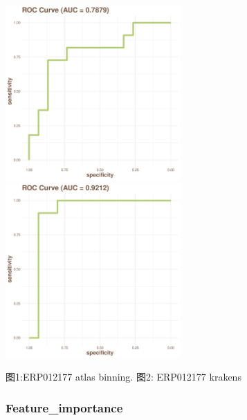 \documentclass[
]{article}
\begin{document}
\includegraphics[width=0.5\textwidth,height=0.5\textheight]{../../Analysis_shotgun_ERP012177/03_ML/shotgun/atlas_binning/ERP012177_binning_best.model_draw_Roc_plot.pdf}
\includegraphics[width=0.5\textwidth,height=0.5\textheight]{../../Analysis_shotgun_ERP012177/03_ML/shotgun/krakens/ERP012177_best.model_draw_Roc_plot.pdf}

图1:ERP012177 atlas binning. 图2: ERP012177 krakens

\hypertarget{feature_importance}{%
\subsubsection{Feature\_importance}\label{feature_importance}}
\end{document}
